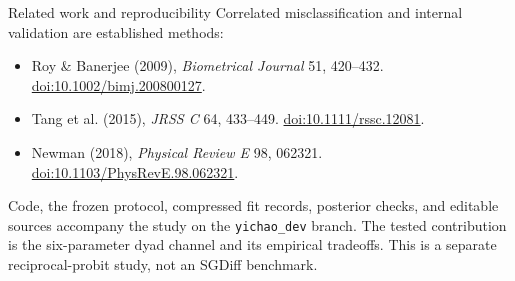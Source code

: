 \documentclass[aspectratio=169,11pt]{beamer}
\newcommand{\source}[1]{\vfill{\scriptsize\color{graytext}#1}\par}
\begin{document}
\begin{frame}{Related work and reproducibility}
\small
Correlated misclassification and internal validation are established methods:
\begin{itemize}
\item Roy \& Banerjee (2009), \emph{Biometrical Journal} 51, 420--432. \href{https://doi.org/10.1002/bimj.200800127}{doi:10.1002/bimj.200800127}.
\item Tang et al. (2015), \emph{JRSS C} 64, 433--449. \href{https://doi.org/10.1111/rssc.12081}{doi:10.1111/rssc.12081}.
\item Newman (2018), \emph{Physical Review E} 98, 062321. \href{https://doi.org/10.1103/PhysRevE.98.062321}{doi:10.1103/PhysRevE.98.062321}.
\end{itemize}
\vspace{3mm}
Code, the frozen protocol, compressed fit records, posterior checks, and editable sources accompany the study on the \texttt{yichao\_dev} branch.
\source{The tested contribution is the six-parameter dyad channel and its empirical tradeoffs. This is a separate reciprocal-probit study, not an SGDiff benchmark.}
\end{frame}
\end{document}
